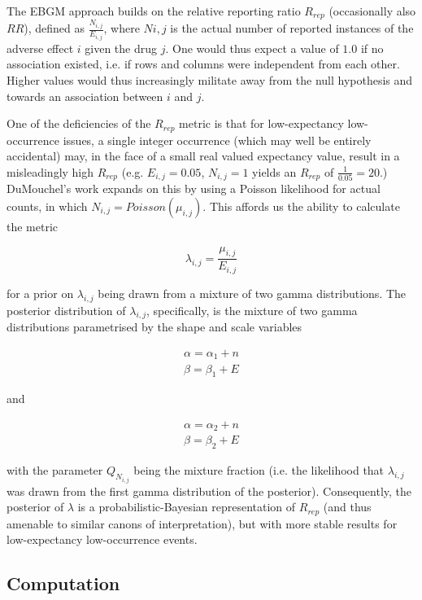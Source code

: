 \documentclass[12pt]{article}
\begin{document}
The EBGM approach builds on the relative reporting ratio $R_{rep}$ (occasionally also $RR$), defined as $\frac{N_{i,j}}{E_{i,j}}$, where $N{i,j}$ is the actual number of reported instances of the adverse effect $i$ given the drug $j$. One would thus expect a value of $1.0$ if no association existed, i.e. if rows and columns were independent from each other. Higher values would thus increasingly militate away from the null hypothesis and towards an association between $i$ and $j$.

One of the deficiencies of the $R_{rep}$ metric is that for low-expectancy low-occurrence issues, a single integer occurrence (which may well be entirely accidental) may, in the face of a small real valued expectancy value, result in a misleadingly high $R_{rep}$ (e.g. $E_{i,j} = 0.05$, $N_{i,j} = 1$ yields an $R_{rep}$ of $\frac{1}{0.05} = 20$.) DuMouchel's work expands on this by using a Poisson likelihood for actual counts, in which $N_{i,j} = Poisson(\mu_{i,j})$.\cite{dumouchel1999bayesian} This affords us the ability to calculate the metric

$$ \lambda_{i,j} = \frac{\mu_{i,j}}{E_{i,j}}$$

for a prior on $\lambda_{i,j}$ being drawn from a mixture of two gamma distributions. The posterior distribution of $\lambda_{i,j}$, specifically, is the mixture of two gamma distributions parametrised by the shape and scale variables


\begin{align*}
	\alpha = \alpha_1 + n \\
	\beta = \beta_1 + E
\end{align*}

and 

\begin{align*}
	\alpha = \alpha_2 + n \\
	\beta = \beta_2 + E
\end{align*}


with the parameter $Q_{N_{i,j}}$ being the mixture fraction (i.e. the likelihood that $\lambda_{i,j}$ was drawn from the first gamma distribution of the posterior). Consequently, the posterior of $\lambda$ is a probabilistic-Bayesian representation of $R_{rep}$ (and thus amenable to similar canons of interpretation), but with more stable results for low-expectancy low-occurrence events.


\subsection{Computation} %
\label{sub:computation}
\end{document}
